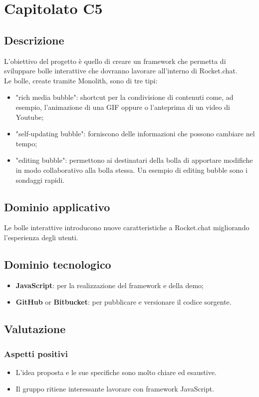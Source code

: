 \section {Capitolato C5}
	\subsection {Descrizione}
		L'obiettivo del progetto è quello di creare un framework che permetta di sviluppare bolle interattive che dovranno lavorare all'interno di Rocket.chat. \\
		Le bolle, create tramite Monolith, sono di tre tipi:
		\begin{itemize}
			\item "rich media bubble": shortcut per la condivisione di contenuti come, ad esempio, l'animazione di una GIF oppure o l'anteprima di un video di Youtube;
			\item "self-updating bubble": forniscono delle informazioni che possono cambiare nel tempo;
			\item "editing bubble": permettono ai destinatari della bolla di apportare modifiche in modo collaborativo alla bolla stessa. Un esempio di editing bubble sono i sondaggi rapidi.
		\end{itemize}
	\subsection {Dominio applicativo}
		Le bolle interattive introducono nuove caratteristiche a Rocket.chat migliorando l'esperienza degli utenti.
	\subsection {Dominio tecnologico}
		\begin{itemize}
		\item \textbf{JavaScript}: per la realizzazione del framework e della demo;
		\item \textbf{GitHub} or \textbf{Bitbucket}: per pubblicare e versionare il codice sorgente.
		\end{itemize}
	\subsection {Valutazione}
		\subsubsection {Aspetti positivi}
			\begin{itemize}
				\item L’idea proposta e le sue specifiche sono molto chiare ed esaustive.
				\item Il gruppo ritiene interessante lavorare con framework JavaScript.
			\end{itemize}
